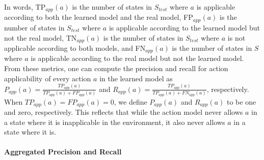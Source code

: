 \documentclass{article}
\theoremstyle{definition}
\theoremstyle{remark}
\newcommand{\stest}{\ensuremath{S_{\textit{test}}}\xspace}
\newcommand{\app}{\ensuremath{\textit{app}}\xspace}
\newif\ifaddcomments
\newcommand{\roni}[1]{\ifaddcomments{\textcolor{red}{[Roni: #1]}}\fi}
\newcommand{\argaman}[1]{\ifaddcomments{\textcolor{blue}{[Argaman: #1]}}\fi}
\newcommand{\leo}[1]{\ifaddcomments{\textcolor{pink}{[Leonardo: #1]}}\fi}
\newcommand{\pascalJr}[1]{\ifaddcomments{\textcolor{cyan}{[Pascal L.: {#1}]}}\fi}
\begin{document}
In words, TP$_{\app}(a)$ is the number of states in \stest where $a$ is applicable according to both the learned model and the real model, FP$_{\app}(a)$ is the number of states in $\stest$ where $a$ is applicable according to the learned model but not the real model, TN$_{\app}(a)$ is the number of states in $\stest$ where $a$ is not applicable according to both models, and FN$_{\app}(a)$ is the number of states in $S$ \pascalJr{\stest?} where $a$ is applicable according to the real model but not the learned model. 
From these metrics, one can compute the precision and recall 
for action applicability
of every action $a$ in the learned model as 
$P_{\app}(a)= \frac{TP_{\app}(a)}{TP_{\app}(a)+FP_{\app}(a)}$ 
and $R_{\app}(a)= \frac{TP_{\app}(a)}{TP_{\app}(a)+FN_{\app}(a)}$, 
respectively. 
When $TP_{\app}(a)=FP_{\app}(a)=0$, we define $P_{\app}(a)$ and $R_{\app}(a)$ to be one and zero, respectively. This reflects that while the action model never allows $a$ in a state where it is inapplicable in the environment, it also never allows $a$ in a state where it is. 




\paragraph{Aggregated Precision and Recall}

\end{document}
